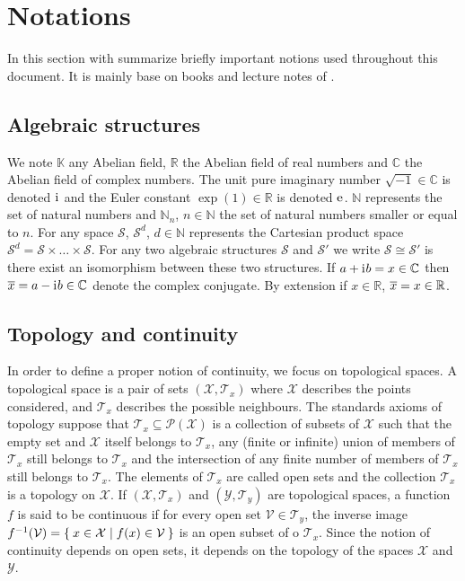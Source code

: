 
\section{Notations}
In this section with summarize briefly important notions used throughout this
document. It is mainly base on books and lecture notes of
\citet{kurdila2006convex,cotaescu2016elements}.

\subsection{Algebraic structures}
\label{sec:notations}
We note $\mathbb{K}$ any Abelian field, $\mathbb{R}$ the
Abelian field of real numbers and $\mathbb{C}$ the Abelian field of complex
numbers. The unit pure imaginary number $\sqrt{-1}\in\mathbb{C}$ is denoted
${\mathrm{i}\mkern1mu}$ and the Euler constant $\exp(1)\in\mathbb{R}$ is denoted $\mathrm{e}\mkern1mu$.
$\mathbb{N}$ represents the set of natural numbers and $\mathbb{N}_n$,
$n\in\mathbb{N}$ the set of natural numbers smaller or equal to $n$. For any
space $\mathcal{S}$, $\mathcal{S}^d$, $d\in\mathbb{N}$ represents the Cartesian
product space $\mathcal{S}^d = \mathcal{S}\times\ldots\times\mathcal{S}$. For
any two algebraic structures $\mathcal{S}$ and $\mathcal{S}'$ we write
$\mathcal{S}\cong\mathcal{S}'$ is there exist an isomorphism between these two
structures. If $a+{\mathrm{i}\mkern1mu} b = x \in \mathbb{C}$ then $\overline{x}=a-{\mathrm{i}\mkern1mu}
b\in\mathbb{C}$ denote the complex conjugate. By extension if $x\in\mathbb{R}$,
$\overline{x}=x\in\mathbb{R}$.

\subsection{Topology and continuity}{}
In order to define a proper notion of continuity, we focus on topological
spaces. A topological space is a pair of sets $(\mathcal{X},\mathcal{T}_x)$
where $\mathcal{X}$ describes the points considered, and $\mathcal{T}_x$
describes the possible neighbours. The standards axioms of topology suppose
that $\mathcal{T}_x\subseteq{\mathcal{P}(\mathcal{X})}$ is a collection of
subsets of $\mathcal{X}$ such that the empty set and $\mathcal{X}$ itself
belongs to $\mathcal{T}_x$, any (finite or infinite) union of members of
$\mathcal{T}_x$ still belongs to $\mathcal{T}_x$ and the intersection of any
finite number of members of $\mathcal{T}_x$ still belongs to $\mathcal{T}_x$.
The elements of $\mathcal{T}_x$ are called open sets and the collection
$\mathcal{T}_x$ is a topology on $\mathcal{X}$. If
$(\mathcal{X},\mathcal{T}_x)$ and $(\mathcal{Y},\mathcal{T}_y)$ are topological
spaces, a function $f$ is said to be continuous if for every open set
$\mathcal{V}\in \mathcal{T}_y$, the inverse image $f^{-1}(\mathcal{V}) = \Set{
x \in \mathcal{X} | f ( x ) \in \mathcal{V} }$ is an open subset of
o
$\mathcal{T}_x$. Since the notion of continuity depends on open sets, it
depends on the topology of the spaces $\mathcal{X}$ and $\mathcal{Y}$.

